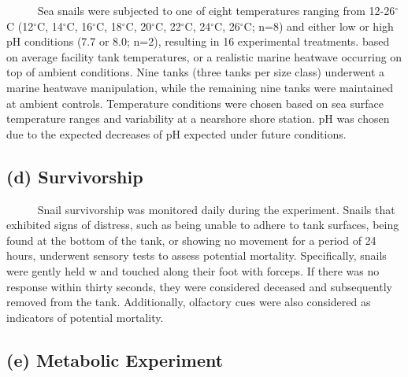 \documentclass[
]{article}
\begin{document}
~~~~~ Sea snails were subjected to one of eight temperatures ranging
from 12-26\(^\circ\)C (12\(^\circ\)C, 14\(^\circ\)C, 16\(^\circ\)C,
18\(^\circ\)C, 20\(^\circ\)C, 22\(^\circ\)C, 24\(^\circ\)C,
26\(^\circ\)C; n=8) and either low or high pH conditions (7.7 or 8.0;
n=2), resulting in 16 experimental treatments. based on average facility
tank temperatures, or a realistic marine heatwave occurring on top of
ambient conditions. Nine tanks (three tanks per size class) underwent a
marine heatwave manipulation, while the remaining nine tanks were
maintained at ambient controls. Temperature conditions were chosen based
on sea surface temperature ranges and variability at a nearshore shore
station. pH was chosen due to the expected decreases of pH expected
under future conditions.

\hypertarget{d-survivorship}{%
\subsection{(d) Survivorship}\label{d-survivorship}}

~~~~~ Snail survivorship was monitored daily during the experiment.
Snails that exhibited signs of distress, such as being unable to adhere
to tank surfaces, being found at the bottom of the tank, or showing no
movement for a period of 24 hours, underwent sensory tests to assess
potential mortality. Specifically, snails were gently held w and touched
along their foot with forceps. If there was no response within thirty
seconds, they were considered deceased and subsequently removed from the
tank. Additionally, olfactory cues were also considered as indicators of
potential mortality.

\hypertarget{e-metabolic-experiment}{%
\subsection{(e) Metabolic Experiment}\label{e-metabolic-experiment}}
\end{document}

